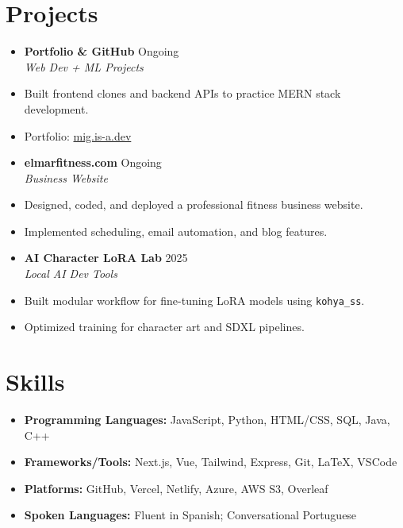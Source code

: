 \documentclass[letterpaper,10pt]{article}
\newcommand{\resumeItem}[1]{\item\small{#1}}
\newcommand{\resumeSubheading}[4]{
  \vspace{-1pt}\item
    \textbf{#1} \hfill #2 \\
    \textit{\small#3} \hfill \textit{\small #4}
}
\begin{document}
\section*{Projects}
\begin{itemize}[leftmargin=0.15in]
  \resumeSubheading
    {Portfolio \& GitHub}{Ongoing}
    {Web Dev + ML Projects}{}
    \resumeItem{Built frontend clones and backend APIs to practice MERN stack development.}
    \resumeItem{Portfolio: \href{https://mig.is-a.dev}{mig.is-a.dev}}

  \resumeSubheading
    {elmarfitness.com}{Ongoing}
    {Business Website}{}
    \resumeItem{Designed, coded, and deployed a professional fitness business website.}
    \resumeItem{Implemented scheduling, email automation, and blog features.}
    
  \resumeSubheading
    {AI Character LoRA Lab}{2025}
    {Local AI Dev Tools}{}
    \resumeItem{Built modular workflow for fine-tuning LoRA models using \texttt{kohya\_ss}.}
    \resumeItem{Optimized training for character art and SDXL pipelines.}
\end{itemize}

\section*{Skills}
\begin{itemize}[leftmargin=0.15in, label={}]
  \item \textbf{Programming Languages:} JavaScript, Python, HTML/CSS, SQL, Java, C++
  \item \textbf{Frameworks/Tools:} Next.js, Vue, Tailwind, Express, Git, LaTeX, VSCode
  \item \textbf{Platforms:} GitHub, Vercel, Netlify, Azure, AWS S3, Overleaf
  \item \textbf{Spoken Languages:} Fluent in Spanish; Conversational Portuguese
\end{itemize}
\end{document}
